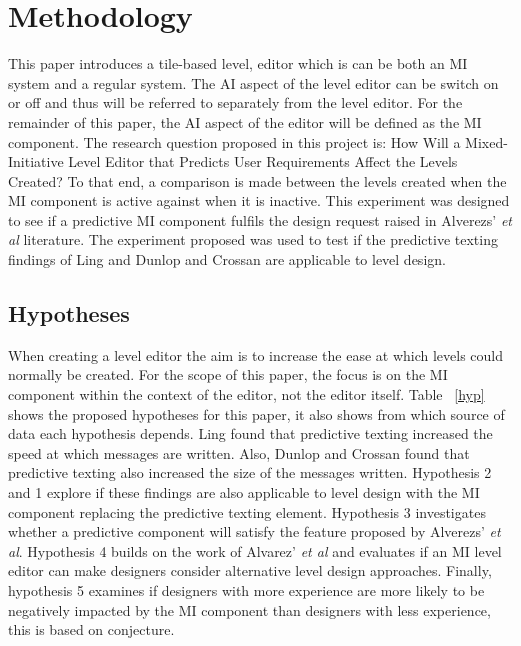 \documentclass[journal]{IEEEtran}
\begin{document}
\section{Methodology}
This paper introduces a tile-based level, editor which is can be both an MI system and a regular system. The AI aspect of the level editor can be switch on or off and thus will be referred to separately from the level editor. For the remainder of this paper, the AI aspect of the editor will be defined as the MI component.  The research question proposed in this project is: How Will a Mixed-Initiative Level Editor that Predicts User Requirements Affect the Levels Created? To that end, a comparison is made between the levels created when the MI component is active against when it is inactive. This experiment was designed to see if a predictive MI component fulfils the design request raised in Alverezs' \textit{et al}\cite{alvarez2018fostering} literature. The experiment proposed was used to test if the predictive texting findings of Ling \cite{ling2005length} and Dunlop and Crossan\cite{dunlop2000predictive} are applicable to level design.  

\subsection{Hypotheses}\label{Hypotheses}
When creating a level editor the aim is to increase the ease at which levels could normally be created. For the scope of this paper, the focus is on the MI component within the context of the editor, not the editor itself. Table ~\ref{hyp} shows the proposed hypotheses for this paper, it also shows from which source of data each hypothesis depends. Ling \cite{ling2005length} found that predictive texting increased the speed at which messages are written. Also, Dunlop and Crossan\cite{dunlop2000predictive} found that predictive texting also increased the size of the messages written. Hypothesis 2 and 1 explore if these findings are also applicable to level design with the MI component replacing the predictive texting element. Hypothesis 3 investigates whether a predictive component will satisfy the feature proposed by Alverezs' \textit{et al}\cite{alvarez2018fostering}. Hypothesis 4 builds on the work of Alvarez' \textit{et al}\cite{alvarez2018fostering} and evaluates if an MI level editor can make designers consider alternative level design approaches. Finally, hypothesis 5 examines if designers with more experience are more likely to be negatively impacted by the MI component than designers with less experience, this is based on conjecture.
\end{document}
